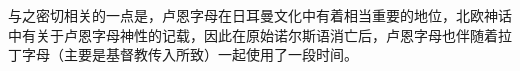 
与之密切相关的一点是，卢恩字母在日耳曼文化中有着相当重要的地位，北欧神话中有关于卢恩字母神性的记载，因此在原始诺尔斯语消亡后，卢恩字母也伴随着拉丁字母（主要是基督教传入所致）一起使用了一段时间。

